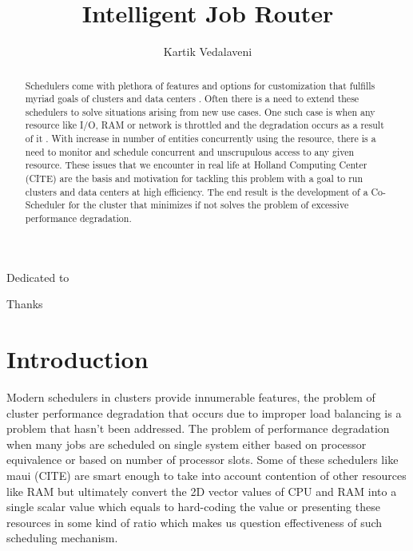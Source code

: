 \documentclass[ms,electronic,double]{nuthesis}
\begin{document}
\frontmatter
\title{Intelligent Job Router}
\author{Kartik Vedalaveni}
\maketitle

\begin{abstract}
Schedulers come with plethora of features and 
options for customization that fulfills myriad goals of  
clusters and data centers . Often there is a need to extend these schedulers to solve 
situations arising from new use cases. One such case is when any resource like I/O, RAM or network is
throttled and the degradation occurs as a result of it . With increase in number of entities concurrently 
using the resource, there is a 
need to monitor and schedule concurrent and unscrupulous access to any given resource.
These issues that we encounter in real life at Holland Computing Center (CITE) are the 
basis and motivation for tackling this problem with a goal to run clusters and data centers
at high efficiency. The end result is the development of a Co-Scheduler for the
cluster that minimizes if not solves the problem of excessive performance degradation.

\end{abstract}

\begin{dedication}
Dedicated to 
\end{dedication}

\begin{acknowledgments}
Thanks
\end{acknowledgments}

\tableofcontents


\mainmatter

\chapter{Introduction}
Modern schedulers in clusters provide innumerable features, the problem of cluster 
performance degradation that occurs due to improper load balancing is a problem  that hasn't been addressed. 
The problem of performance degradation when many jobs are scheduled on single system either 
based on processor equivalence or based on number of processor slots. Some of 
these schedulers like maui (CITE) are smart enough to take into account contention of other 
resources like RAM but ultimately convert the 2D vector values of CPU and RAM 
into a single scalar value which equals to hard-coding the value or presenting these resources
in some kind of ratio which makes us question effectiveness of such scheduling mechanism.
\end{document}
